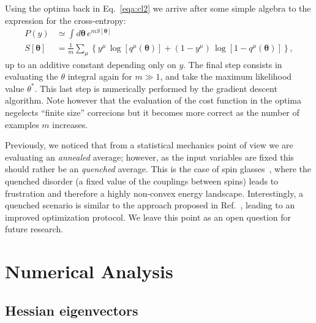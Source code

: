 \documentclass{article}
\begin{document}
%
Using the optima back in Eq.~\eqref{eqa:cl2} we arrive after some simple algebra to the expression for the cross-entropy:
%
\begin{align} \label{eq:cl3}
P(y) &\simeq \int d\boldsymbol{\theta} \, e^{m S[\boldsymbol{\theta}]} \\ \nonumber
S[\boldsymbol{\theta}] &= \frac{1}{m} \sum_{\mu} \left\{ y^{\mu} \, \log [ q^{\mu}( \boldsymbol{\theta} ) ] + (1-y^{\mu}) \, \log [1-q^{\mu}( \boldsymbol{\theta}) ] \right\},
\end{align}
%
up to an additive constant depending only on $y$. The final step consists in evaluating the $\theta$ integral again for $m \gg 1$, and take the maximum likelihood value $\theta^*$. This last step is numerically performed by the gradient descent algorithm. Note however that the evaluation of the cost function in the optima negelects ``finite size'' correcions but it becomes more correct as the number of examples $m$ increases.

Previously, we noticed that from a statistical mechanics point of view we are evaluating an {\it annealed} average; however, as the input variables are fixed this should rather be an {\it quenched} average. This is the case of spin glasses~\cite{parisi2, giardina}, where the quenched disorder (a fixed value of the couplings between spins) leads to frustration and therefore a highly non-convex energy landscape. Interestingly, a quenched scenario is similar to the approach proposed in Ref.~\cite{pratik}, leading to an improved optimization protocol. We leave this point as an open question for future research.

\section{Numerical Analysis}



\subsection{Hessian eigenvectors}
\end{document}
